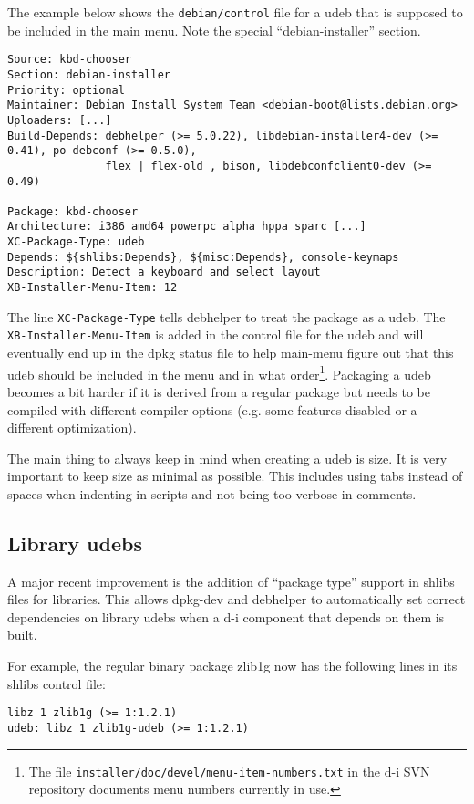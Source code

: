 \documentclass[a4paper,10pt]{article}
\begin{document}
The example below shows the \texttt{debian/control} file for a udeb that is supposed to be included in the main menu. Note the special “debian-installer” section.

\begin{verbatim}
Source: kbd-chooser
Section: debian-installer
Priority: optional
Maintainer: Debian Install System Team <debian-boot@lists.debian.org>
Uploaders: [...]
Build-Depends: debhelper (>= 5.0.22), libdebian-installer4-dev (>= 0.41), po-debconf (>= 0.5.0),
               flex | flex-old , bison, libdebconfclient0-dev (>= 0.49)

Package: kbd-chooser
Architecture: i386 amd64 powerpc alpha hppa sparc [...]
XC-Package-Type: udeb
Depends: ${shlibs:Depends}, ${misc:Depends}, console-keymaps
Description: Detect a keyboard and select layout
XB-Installer-Menu-Item: 12
\end{verbatim}

The line \texttt{XC-Package-Type} tells debhelper to treat the package as a udeb. The \texttt{XB-Installer-Menu-Item} is added in the control file for the udeb and will eventually end up in the dpkg status file to help main-menu figure out that this udeb should be included in the menu and in what order\footnote{The file \texttt{installer/doc/devel/menu-item-numbers.txt} in the d-i SVN repository documents menu numbers currently in use.}. Packaging a udeb becomes a bit harder if it is derived from a regular package but needs to be compiled with different compiler options (e.g. some features disabled or a different optimization). 

The main thing to always keep in mind when creating a udeb is size. It is very important to keep size as minimal as possible. This includes using tabs instead of spaces when indenting in scripts and not being too verbose in comments. 


\subsection{Library udebs}
A major recent improvement is the addition of “package type” support in shlibs files for libraries. This allows dpkg-dev and debhelper to automatically set correct dependencies on library udebs when a d-i component that depends on them is built. 

For example, the regular binary package zlib1g now has the following lines in its shlibs control file:

\begin{verbatim}
libz 1 zlib1g (>= 1:1.2.1)
udeb: libz 1 zlib1g-udeb (>= 1:1.2.1)
\end{verbatim}
\end{document}
